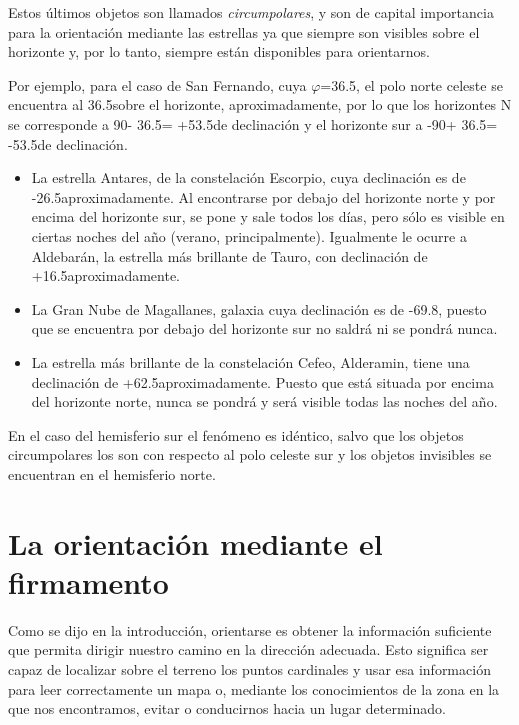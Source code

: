 \documentclass[10pt,a5paper,twoside]{amsbook}
\begin{document}
Estos últimos objetos son llamados \textit{circumpolares}, y son de capital importancia para la orientación mediante las estrellas ya que siempre son visibles sobre el horizonte y, por lo tanto, siempre están disponibles para orientarnos.

Por ejemplo, para el caso de San Fernando, cuya $\varphi$=36.5\textdegree, el polo norte celeste se encuentra al 36.5\textdegree sobre el horizonte, aproximadamente, por lo que los horizontes N se corresponde a  90\textdegree - 36.5\textdegree = +53.5\textdegree de declinación y el horizonte sur a -90\textdegree + 36.5\textdegree = -53.5\textdegree de declinación.

\begin{itemize}
 \item La estrella Antares, de la constelación Escorpio, cuya declinación es de -26.5\textdegree aproximadamente. Al encontrarse por debajo del horizonte norte y por encima del horizonte sur, se pone y sale todos los días, pero sólo es visible en ciertas noches del año (verano, principalmente). Igualmente le ocurre a Aldebarán, la estrella más brillante de Tauro, con declinación de +16.5\textdegree aproximadamente.
 \item La Gran Nube de Magallanes, galaxia cuya declinación es de -69.8\textdegree, puesto que se encuentra por debajo del horizonte sur no saldrá ni se pondrá nunca.
 \item La estrella más brillante de la constelación Cefeo, Alderamin, tiene una declinación de +62.5\textdegree  aproximadamente. Puesto que está situada por encima del horizonte norte, nunca se pondrá y será visible todas las noches del año.
\end{itemize}

En el caso del hemisferio sur el fenómeno es idéntico, salvo que los objetos circumpolares los son con respecto al polo celeste sur y los objetos invisibles se encuentran en el hemisferio norte. 

\chapter*{La orientación mediante el firmamento}

Como se dijo en la introducción, orientarse es obtener la información suficiente que permita  dirigir nuestro camino en la dirección adecuada. Esto significa ser capaz de localizar sobre el terreno los puntos cardinales y usar esa información para leer correctamente un mapa o, mediante los conocimientos de la zona en la que nos encontramos, evitar o conducirnos hacia un lugar determinado.
\end{document}
